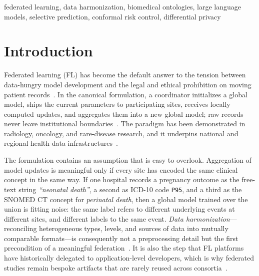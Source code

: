 \documentclass[conference]{IEEEtran}
\begin{document}
\begin{abstract}
0.004 and 0.000 recall at 23--45\% additional candidate load. We report no new measurement of the full architecture, and every number we cite for adjudication, calibration, or reuse is attributed to the system that published it. FedHarm preserves the ontology-agnostic, configurable character of the two-step recipe while relocating it inside the trust boundary and adding the uncertainty control that reliable clinical deployment requires.
\end{abstract}

\begin{IEEEkeywords}
federated learning, data harmonization, biomedical ontologies, large language models, selective prediction, conformal risk control, differential privacy
\end{IEEEkeywords}

\section{Introduction}

Federated learning (FL) has become the default answer to the tension between data-hungry model development and the legal and ethical prohibition on moving patient records~\cite{b2,b3,b4,b5}. In the canonical formulation, a coordinator initializes a global model, ships the current parameters to participating sites, receives locally computed updates, and aggregates them into a new global model; raw records never leave institutional boundaries~\cite{b3}. The paradigm has been demonstrated in radiology, oncology, and rare-disease research, and it underpins national and regional health-data infrastructures~\cite{b5,b6}.

The formulation contains an assumption that is easy to overlook. Aggregation of model updates is meaningful only if every site has encoded the same clinical concept in the same way. If one hospital records a pregnancy outcome as the free-text string \emph{``neonatal death''}, a second as ICD-10 code \texttt{P95}, and a third as the SNOMED CT concept for \emph{perinatal death}, then a global model trained over the union is fitting noise: the same label refers to different underlying events at different sites, and different labels to the same event. \emph{Data harmonization}---reconciling heterogeneous types, levels, and sources of data into mutually comparable formats---is consequently not a preprocessing detail but the first precondition of a meaningful federation~\cite{b42,b43}. It is also the step that FL platforms have historically delegated to application-level developers, which is why federated studies remain bespoke artifacts that are rarely reused across consortia~\cite{b1,b43}.
\end{document}
